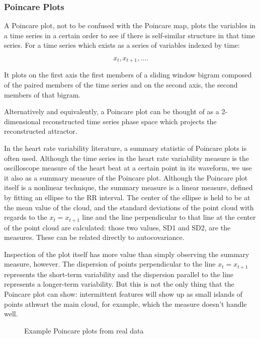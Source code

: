 \documentclass[12pt]{article}
\begin{document}
\subsubsection{Poincare Plots}

A Poincare plot\cite{hrv1}, not to be confused with the Poincare map, plots the variables in a time series in a certain order to see if there is self-similar structure in that time series. For a time series which exists as a series of variables indexed by time:

$$x_t, x_{t+1}, .... $$

It plots on the first axis the first members of a sliding window bigram composed of the paired members of the time series and on the second axis, the second members of that bigram.

Alternatively and equivalently, a Poincare plot can be thought of as a 2-dimensional reconstructed time series phase space which projects the reconstructed attractor\cite{kamen}.

In the heart rate variability literature, a summary statistic of Poincare plots is often used. Although the time series in the heart rate variability measure is the oscilloscope measure of the heart beat at a certain point in its waveform, we use it also as a summary measure of the Poincare plot. Although the Poincare plot itself is a nonlinear technique, the summary measure is a linear measure\cite{kamen}, defined by fitting an ellipse to the RR interval. The center of the ellipse is held to be at the mean value of the cloud, and the standard deviations of the point cloud with regards to the $x_t = x_{t+1}$ line and the line perpendicular to that line at the center of the point cloud are calculated: those two values, SD1 and SD2, are the measures. These can be related directly to autocovariance\cite{kamen}.

Inspection of the plot itself has more value than simply observing the summary measure, however. The dispersion of points perpendicular to the line $x_t = x_{t+1}$ represents the short-term variability and the dispersion parallel to the line represents a longer-term variability. But this is not the only thing that the Poincare plot can show: intermittent features will show up as small islands of points athwart the main cloud, for example, which the measure doesn't handle well.



\begin{figure}\label{fig:poincare_plots}
  \begin{center}
  \end{center}
  \caption{Example Poincare plots from real data}
\end{figure}
\end{document}
